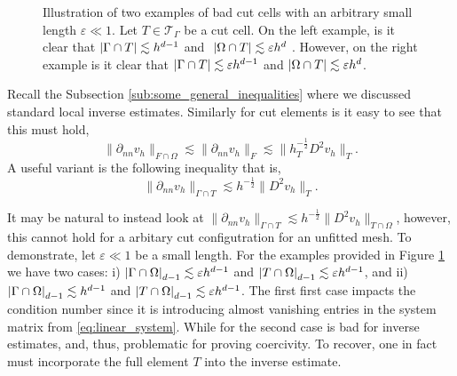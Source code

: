 \begin{figure}[b]
\begin{minipage}{0.4\textwidth}
    \end{minipage}
        \caption{Illustration of two examples of bad cut cells with an arbitrary small length $\varepsilon \ll 1 $. Let $T \in  \mathcal{T}_{\Gamma } $ be a cut cell.  On the left example, is it clear that $\left\lvert  \Gamma \cap T  \right\rvert
            \lesssim  h^{d-1}$ and $  \ \abs{ \Omega  \cap T } \lesssim  \varepsilon  h^{d}$  . However, on the right example is it clear that  $\left\lvert  \Gamma \cap T  \right\rvert
            \lesssim  \varepsilon h^{d-1}$ and $\left\lvert  \Omega  \cap T  \right\rvert \lesssim  \varepsilon  h^{d}$.}
        \label{fig:intersection-example}
\end{figure}


Recall the Subsection \ref{sub:some_general_inequalities} where we discussed standard local inverse estimates.
Similarly for cut elements is it easy to see that this must hold,
\begin{equation*}
     \| \partial _{nn}  v_{h} \|_{F \cap \Omega    }^{  }  \lesssim\| \partial _{nn}  v_{h} \|_{F }^{  }  \lesssim   \| h_{T}^{-\frac{1}{2}} D ^2 v_{h} \|_{ T }^{  }.
\end{equation*}
A useful variant is the following inequality that is,
\begin{equation}
    \label{eq:inv_full}
\| \partial _{nn} v_{h} \|_{ \Gamma \cap T  }^{  } \lesssim h^{-\frac{1}{2}} \| D^2 v_{h} \|_{ T }^{  }.
\end{equation}
\begin{remark}
    It may be natural to instead look at $\| \partial _{nn} v_{h} \|_{ \Gamma \cap T  }^{  } \lesssim h^{-\frac{1}{2}} \| D^2 v_{h} \|_{ T\cap \Omega  }^{  }$, however, this cannot hold for a arbitary cut configutration for an unfitted mesh. To demonstrate, let $\varepsilon \ll 1$ be a small length. For the examples provided in
    Figure \ref{fig:intersection-example} we have two cases: i) $\left\lvert  \Gamma \cap \Omega   \right\rvert_{d-1} \lesssim \varepsilon h^{d-1}  $ and $\left\lvert  T \cap \Omega   \right\rvert_{d-1} \lesssim \varepsilon h^{d-1}  $, and ii)
    $\left\lvert  \Gamma \cap \Omega   \right\rvert_{d-1} \lesssim  h^{d-1}  $ and $\left\lvert  T \cap \Omega   \right\rvert_{d-1} \lesssim \varepsilon h^{d-1}  $.
    The first first case impacts the condition number since it is introducing almost vanishing entries in the system matrix from \eqref{eq:linear_system}.
    While for the second case is bad for inverse estimates, and, thus, problematic for proving coercivity. To recover, one in fact must incorporate the full element $T$ into the inverse estimate.
\end{remark}


